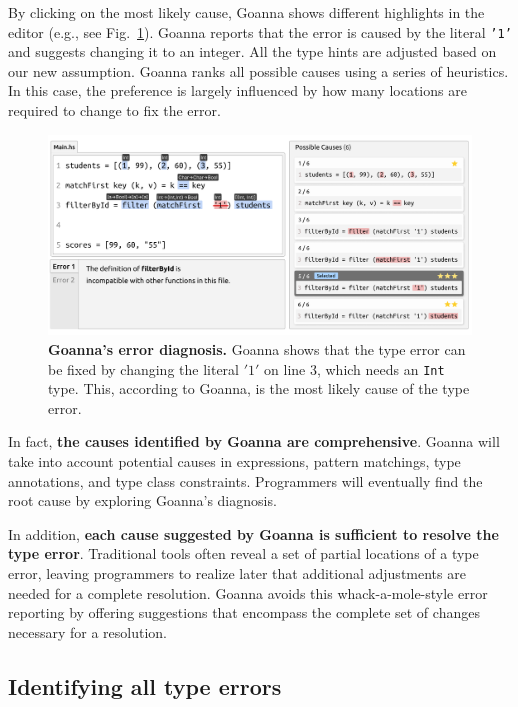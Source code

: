 \documentclass[pdflatex,lineno,sn-nature,Numbered]{sn-jnl}%
\begin{document}
    By clicking on the most likely cause, Goanna shows different highlights in the editor (e.g., see Fig.~\ref{fig:goanna-example-2}). Goanna reports that the error is caused by the literal \texttt{'1'} and suggests changing it to an integer. All the type hints are adjusted based on our new assumption. Goanna ranks all possible causes using a series of heuristics. In this case, the preference is largely influenced by how many locations are required to change to fix the error. 

    \begin{figure}[ht!]
        \centering
        \includegraphics[width=\linewidth]{images/goanna-example-2.pdf}
        \caption[Goanna's showing possible causes of a type error (2)]{\textbf{Goanna's error diagnosis.} Goanna shows that the type error can be fixed by changing the literal $'1'$ on line 3, which needs an \texttt{Int} type. This, according to Goanna, is the most likely cause of the type error.}
        \label{fig:goanna-example-2}
    \end{figure}

    In fact, {\bf the causes identified by Goanna are comprehensive}. Goanna will take into account potential causes in expressions, pattern matchings, type annotations, and type class constraints. Programmers will eventually find the root cause by exploring Goanna's diagnosis.

    
    In addition, {\bf each cause suggested by Goanna is sufficient to resolve the type error}. Traditional tools often reveal a set of partial locations of a type error, leaving programmers to realize later that additional adjustments are needed for a complete resolution. Goanna avoids this whack-a-mole-style error reporting by offering suggestions that encompass the complete set of changes necessary for a resolution.
    
    \subsection{Identifying all type errors} \label{sub:all-errors}
    
\end{document}
